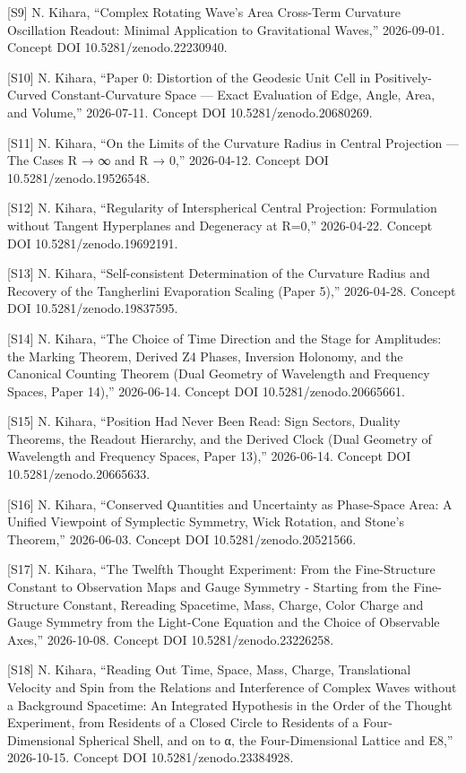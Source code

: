 \documentclass[
  a4paper,
]{article}
\begin{document}
{[}S9{]} N. Kihara, ``Complex Rotating Wave's Area Cross-Term Curvature
Oscillation Readout: Minimal Application to Gravitational Waves,''
2026-09-01. Concept DOI 10.5281/zenodo.22230940.

{[}S10{]} N. Kihara, ``Paper 0: Distortion of the Geodesic Unit Cell in
Positively-Curved Constant-Curvature Space --- Exact Evaluation of Edge,
Angle, Area, and Volume,'' 2026-07-11. Concept DOI
10.5281/zenodo.20680269.

{[}S11{]} N. Kihara, ``On the Limits of the Curvature Radius in Central
Projection --- The Cases R → ∞ and R → 0,'' 2026-04-12. Concept DOI
10.5281/zenodo.19526548.

{[}S12{]} N. Kihara, ``Regularity of Interspherical Central Projection:
Formulation without Tangent Hyperplanes and Degeneracy at R=0,''
2026-04-22. Concept DOI 10.5281/zenodo.19692191.

{[}S13{]} N. Kihara, ``Self-consistent Determination of the Curvature
Radius and Recovery of the Tangherlini Evaporation Scaling (Paper 5),''
2026-04-28. Concept DOI 10.5281/zenodo.19837595.

{[}S14{]} N. Kihara, ``The Choice of Time Direction and the Stage for
Amplitudes: the Marking Theorem, Derived Z4 Phases, Inversion Holonomy,
and the Canonical Counting Theorem (Dual Geometry of Wavelength and
Frequency Spaces, Paper 14),'' 2026-06-14. Concept DOI
10.5281/zenodo.20665661.

{[}S15{]} N. Kihara, ``Position Had Never Been Read: Sign Sectors,
Duality Theorems, the Readout Hierarchy, and the Derived Clock (Dual
Geometry of Wavelength and Frequency Spaces, Paper 13),'' 2026-06-14.
Concept DOI 10.5281/zenodo.20665633.

{[}S16{]} N. Kihara, ``Conserved Quantities and Uncertainty as
Phase-Space Area: A Unified Viewpoint of Symplectic Symmetry, Wick
Rotation, and Stone's Theorem,'' 2026-06-03. Concept DOI
10.5281/zenodo.20521566.

{[}S17{]} N. Kihara, ``The Twelfth Thought Experiment: From the
Fine-Structure Constant to Observation Maps and Gauge Symmetry -
Starting from the Fine-Structure Constant, Rereading Spacetime, Mass,
Charge, Color Charge and Gauge Symmetry from the Light-Cone Equation and
the Choice of Observable Axes,'' 2026-10-08. Concept DOI
10.5281/zenodo.23226258.

{[}S18{]} N. Kihara, ``Reading Out Time, Space, Mass, Charge,
Translational Velocity and Spin from the Relations and Interference of
Complex Waves without a Background Spacetime: An Integrated Hypothesis
in the Order of the Thought Experiment, from Residents of a Closed
Circle to Residents of a Four-Dimensional Spherical Shell, and on to α,
the Four-Dimensional Lattice and E8,'' 2026-10-15. Concept DOI
10.5281/zenodo.23384928.
\end{document}
